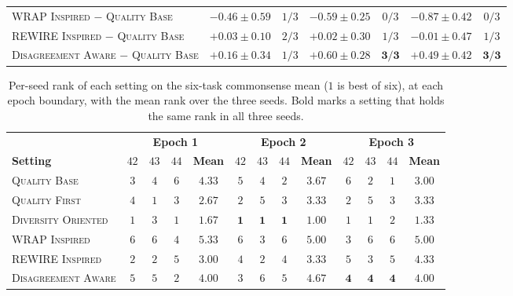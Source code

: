 \begin{table}[t]
\begin{tabular}{lcccccc}
\textsc{WRAP Inspired} $-$ \textsc{Quality Base} & $-0.46 \pm 0.59$ & $1/3$ & $-0.59 \pm 0.25$ & $0/3$ & $-0.87 \pm 0.42$ & $0/3$ \\
\textsc{REWIRE Inspired} $-$ \textsc{Quality Base} & $+0.03 \pm 0.10$ & $2/3$ & $+0.02 \pm 0.30$ & $1/3$ & $-0.01 \pm 0.47$ & $1/3$ \\
\textsc{Disagreement Aware} $-$ \textsc{Quality Base} & $+0.16 \pm 0.34$ & $1/3$ & $+0.60 \pm 0.28$ & $\mathbf{3/3}$ & $+0.49 \pm 0.42$ & $\mathbf{3/3}$ \\
\bottomrule
\end{tabular}
\end{table}

\begin{table}[t]
\centering
\caption{Per-seed rank of each setting on the six-task commonsense mean ($1$ is best of six), at each epoch boundary, with the mean rank over the three seeds. Bold marks a setting that holds the same rank in all three seeds.}
\label{tab:ranks-mean6}
\footnotesize
\setlength{\tabcolsep}{3.5pt}
\renewcommand{\arraystretch}{1.15}

\begin{tabular}{lcccccccccccc}
\toprule
& \multicolumn{4}{c}{\textbf{Epoch 1}} & \multicolumn{4}{c}{\textbf{Epoch 2}} & \multicolumn{4}{c}{\textbf{Epoch 3}} \\
\cmidrule(lr){2-5}\cmidrule(lr){6-9}\cmidrule(lr){10-13}
\textbf{Setting} & $42$ & $43$ & $44$ & \textbf{Mean} & $42$ & $43$ & $44$ & \textbf{Mean} & $42$ & $43$ & $44$ & \textbf{Mean} \\
\midrule
\textsc{Quality Base} & $3$ & $4$ & $6$ & $4.33$ & $5$ & $4$ & $2$ & $3.67$ & $6$ & $2$ & $1$ & $3.00$ \\
\midrule
\textsc{Quality First} & $4$ & $1$ & $3$ & $2.67$ & $2$ & $5$ & $3$ & $3.33$ & $2$ & $5$ & $3$ & $3.33$ \\
\textsc{Diversity Oriented} & $1$ & $3$ & $1$ & $1.67$ & $\mathbf{1}$ & $\mathbf{1}$ & $\mathbf{1}$ & $1.00$ & $1$ & $1$ & $2$ & $1.33$ \\
\textsc{WRAP Inspired} & $6$ & $6$ & $4$ & $5.33$ & $6$ & $3$ & $6$ & $5.00$ & $3$ & $6$ & $6$ & $5.00$ \\
\textsc{REWIRE Inspired} & $2$ & $2$ & $5$ & $3.00$ & $4$ & $2$ & $4$ & $3.33$ & $5$ & $3$ & $5$ & $4.33$ \\
\textsc{Disagreement Aware} & $5$ & $5$ & $2$ & $4.00$ & $3$ & $6$ & $5$ & $4.67$ & $\mathbf{4}$ & $\mathbf{4}$ & $\mathbf{4}$ & $4.00$ \\
\bottomrule
\end{tabular}
\end{table}

